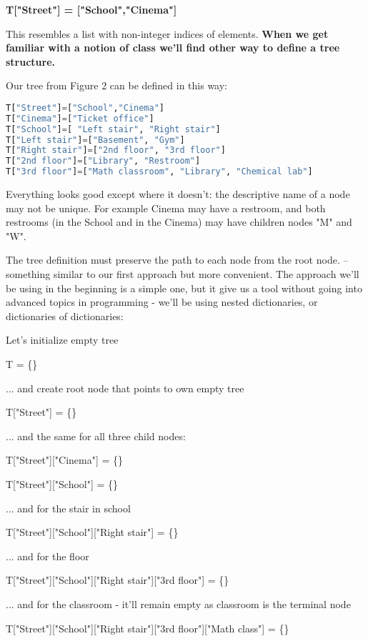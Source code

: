 \medskip
\textbf{T["Street"] = ["School","Cinema"]}
\medskip

This resembles a list with non-integer indices of elements.
\textbf{ When we get familiar with a notion of class we'll
find other way to define a tree structure. }

Our tree from Figure 2 can be defined in this way:

\begin{lstlisting}[style=codelst,language=Python]
T["Street"]=["School","Cinema"]
T["Cinema"]=["Ticket office"]
T["School"]=[ "Left stair", "Right stair"]
T["Left stair"]=["Basement", "Gym"]
T["Right stair"]=["2nd floor", "3rd floor"]
T["2nd floor"]=["Library", "Restroom"]
T["3rd floor"]=["Math classroom", "Library", "Chemical lab"]
\end{lstlisting}

Everything looks good except where it doesn't:
the descriptive name of a node
may not be unique. For example Cinema may have
a restroom, and both restrooms
(in the School and in the Cinema) may have
children nodes "M" and "W".

The tree definition must preserve the path to each node from the root node.
-- something similar to our first approach but more convenient.
The approach we'll be using in the beginning is a simple one,
but it give us a tool without going into advanced topics
in programming - we'll be using nested dictionaries, or dictionaries
of dictionaries:

Let's initialize empty tree

\medskip
T = \{\}
\medskip

... and create root node that points to own empty tree

\medskip
T["Street"] = \{\}
\medskip

... and the same for all three child nodes:

\medskip
T["Street"]["Cinema"] = \{\}

T["Street"]["School"] = \{\}
\medskip

... and for the stair in school

\medskip
T["Street"]["School"]["Right stair"] = \{\}
\medskip

... and for the floor

\medskip
T["Street"]["School"]["Right stair"]["3rd floor"] = \{\}
\medskip

... and for the classroom - it'll remain empty as classroom is the terminal node

\medskip
T["Street"]["School"]["Right stair"]["3rd floor"]["Math class"] = \{\}
\medskip

